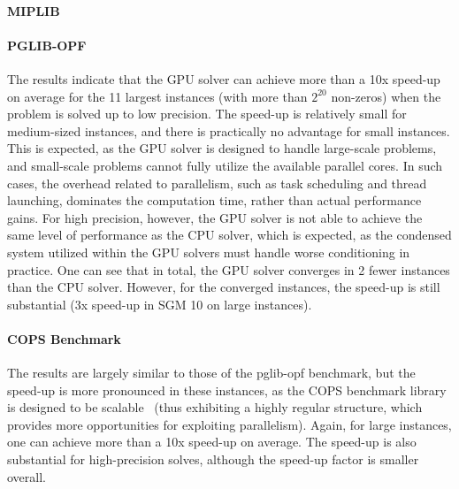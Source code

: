 \documentclass{article}
\begin{document}
\paragraph{MIPLIB}



\paragraph{PGLIB-OPF}
The results indicate that the GPU solver can achieve more than a 10x speed-up on average for the 11 largest instances (with more than $2^{20}$ non-zeros) when the problem is solved up to low precision. The speed-up is relatively small for medium-sized instances, and there is practically no advantage for small instances. This is expected, as the GPU solver is designed to handle large-scale problems, and small-scale problems cannot fully utilize the available parallel cores. In such cases, the overhead related to parallelism, such as task scheduling and thread launching, dominates the computation time, rather than actual performance gains. For high precision, however, the GPU solver is not able to achieve the same level of performance as the CPU solver, which is expected, as the condensed system utilized within the GPU solvers must handle worse conditioning in practice. One can see that in total, the GPU solver converges in 2 fewer instances than the CPU solver. However, for the converged instances, the speed-up is still substantial (3x speed-up in SGM 10 on large instances).



\paragraph{COPS Benchmark}
The results are largely similar to those of the pglib-opf benchmark, but the speed-up is more pronounced in these instances, as the COPS benchmark library is designed to be scalable~\cite{dolanBenchmarkingOptimizationSoftware2001} (thus exhibiting a highly regular structure, which provides more opportunities for exploiting parallelism). Again, for large instances, one can achieve more than a 10x speed-up on average. The speed-up is also substantial for high-precision solves, although the speed-up factor is smaller overall.
\end{document}
